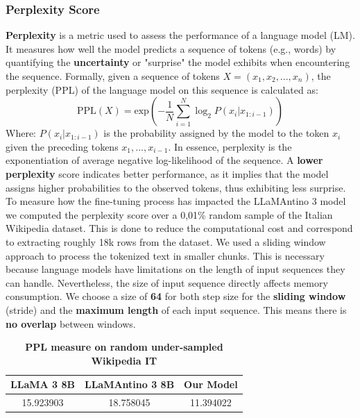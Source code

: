 \documentclass{article}
\begin{document}
	\subsubsection{Perplexity Score}
	\textbf{Perplexity} is a metric used to assess the performance of a language model (LM).	It measures how well the model predicts a sequence of tokens (e.g., words) by quantifying the \textbf{uncertainty} or "surprise" the model exhibits when encountering the sequence. Formally, given a sequence of tokens $X=(x_1,x_2,...,x_n)$, the perplexity (PPL) of the language model on this sequence is calculated as:
	\begin{equation}
		\text{PPL}(X) = \text{exp}(-\frac{1}{N} \sum_{i=1}^{N} \log_2 P(x_i | x_{1:i-1}))
	\end{equation}
	Where: $P(x_i | x_{1:i-1})$ is the probability assigned by the model to the token $x_i$ given the preceding tokens $x_1,...,x_{i-1}$. In essence, perplexity is the exponentiation of average negative log-likelihood of the sequence. A \textbf{lower perplexity} score indicates better performance, as it implies that the model assigns higher probabilities to the observed tokens, thus exhibiting less surprise.\\
	To measure how the fine-tuning process has impacted the LLaMAntino 3 model we computed the perplexity score over a 0,01\% random sample of the Italian Wikipedia dataset. This is done to reduce the computational cost and correspond to extracting roughly 18k rows from the dataset.
	We used a sliding window approach to process the tokenized text in smaller chunks. This is necessary because language models have limitations on the length of input sequences they can handle. Nevertheless, the size of input sequence directly affects memory consumption.
	We choose a size of \textbf{64} for both step size for the \textbf{sliding window} (stride) and the \textbf{maximum length} of each input sequence. This means there is \textbf{no overlap} between windows.

	\begin{table}[h]
		\center
		\begin{tabular}{ccc}
			\toprule
			\textbf{LLaMA 3 8B} & \textbf{LLaMAntino 3 8B} & \textbf{Our Model} \\
			\midrule
			15.923903 & 18.758045 & 11.394022 \\
			\bottomrule
		\end{tabular}
		\caption{\textbf{PPL measure on random under-sampled Wikipedia IT}}
	\end{table} 
\end{document}
